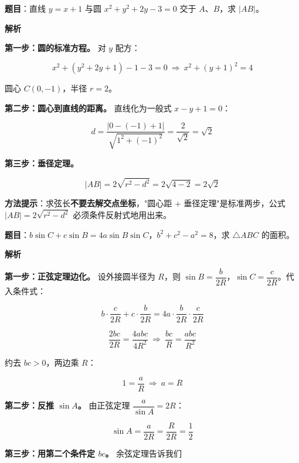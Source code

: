 
\par\medskip


\textbf{题目}：直线 $y=x+1$ 与圆 $x^{2}+y^{2}+2y-3=0$ 交于 $A$、$B$，求 $|AB|$。

\textbf{解析}

\textbf{第一步：圆的标准方程。} 对 $y$ 配方：

\[x^{2}+\left(y^{2}+2y+1\right)-1-3=0\ \Longrightarrow\ x^{2}+(y+1)^{2}=4\]

圆心 $C(0,-1)$，半径 $r=2$。

\textbf{第二步：圆心到直线的距离。} 直线化为一般式 $x-y+1=0$：

\[d=\frac{|0-(-1)+1|}{\sqrt{1^{2}+(-1)^{2}}}=\frac2{\sqrt2}=\sqrt2\]

\textbf{第三步：垂径定理。}

\[|AB|=2\sqrt{r^{2}-d^{2}}=2\sqrt{4-2}=2\sqrt2\]


\begin{gktip}
\textbf{方法提示}：求弦长\textbf{不要去解交点坐标}，"圆心距 + 垂径定理"是标准两步，公式 $|AB|=2\sqrt{r^{2}-d^{2}}$ 必须条件反射式地用出来。
\end{gktip}

\par\medskip


\textbf{题目}：$b\sin C+c\sin B=4a\sin B\sin C$，$b^{2}+c^{2}-a^{2}=8$，求 $\triangle ABC$ 的面积。

\textbf{解析}

\textbf{第一步：正弦定理边化。} 设外接圆半径为 $R$，则 $\sin B=\dfrac b{2R}$，$\sin C=\dfrac c{2R}$。代入条件式：

\[b\cdot\frac c{2R}+c\cdot\frac b{2R}=4a\cdot\frac b{2R}\cdot\frac c{2R}\]

\[\frac{2bc}{2R}=\frac{4abc}{4R^{2}}\ \Longrightarrow\ \frac{bc}R=\frac{abc}{R^{2}}\]

约去 $bc>0$，两边乘 $R$：

\[1=\frac aR\ \Longrightarrow\ a=R\]

\textbf{第二步：反推 $\sin A$。} 由正弦定理 $\dfrac a{\sin A}=2R$：

\[\sin A=\frac a{2R}=\frac R{2R}=\frac12\]

\textbf{第三步：用第二个条件定 $bc$。} 余弦定理告诉我们


